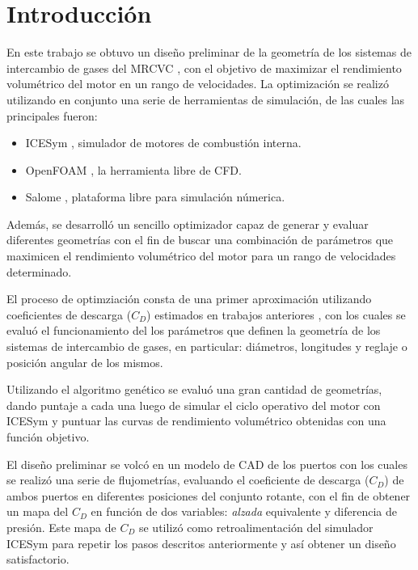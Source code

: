 \chapter{Introducción}

En este trabajo se obtuvo un diseño preliminar de la geometría de los  sistemas
de intercambio de gases del MRCVC \cite{toth}, con el objetivo de maximizar el
rendimiento volumétrico del motor en un rango de velocidades.
%
La optimización se realizó utilizando en conjunto una serie de herramientas de
simulación, de las cuales las principales fueron: 

\begin{itemize}
    \item ICESym \cite{icesym}, simulador de motores de combustión interna.
    \item OpenFOAM \cite{openfoam}, la herramienta libre de CFD.
    \item Salome \cite{salome}, plataforma libre para simulación númerica.
\end{itemize}


Además, se desarrolló un sencillo optimizador capaz de generar y evaluar
diferentes geometrías con el fin de buscar una combinación de parámetros que
maximicen el rendimiento volumétrico del motor para un rango de velocidades
determinado.


El proceso de optimziación consta de una primer aproximación utilizando
coeficientes de descarga ($C_{D}$) estimados en trabajos anteriores
\cite{lopez13}, con los cuales se evaluó el funcionamiento del los parámetros
que definen la geometría de los sistemas de intercambio de gases, en
particular: diámetros, longitudes y reglaje o posición angular de los mismos.

Utilizando el algoritmo genético se evaluó una gran cantidad de geometrías,
dando puntaje a cada una luego de simular el ciclo operativo del motor con
ICESym y puntuar las curvas de rendimiento volumétrico obtenidas con una
función objetivo.

El diseño preliminar se volcó en un modelo de CAD de los puertos con los cuales
se realizó una serie de flujometrías, evaluando el coeficiente de descarga
($C_D$) de ambos puertos en diferentes posiciones del conjunto rotante, con el
fin de obtener un mapa del $C_D$ en función de dos variables: \emph{alzada}
equivalente y diferencia de presión.
%
Este mapa de $C_{D}$ se utilizó como retroalimentación del simulador ICESym
para repetir los pasos descritos anteriormente y así obtener un diseño
satisfactorio.


